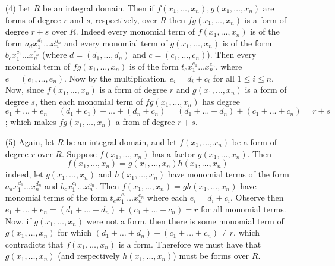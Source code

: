 \begin{example}
\begin{enumerate}
    \item[(4)] Let $R$ be an integral domain. Then if $f(x_1, \dots,
      x_n), g(x_1, \dots, x_n)$ are forms of degree $r$ and $s$,
      respectively, over $R$ then $fg(x_1, \dots, x_n)$ is a form of
      degree $r+s$ over $R$. Indeed every monomial term of $f(x_1,
      \dots, x_n)$ is of the form $a_dx_1^{d_1} \dots x_n^{d_n}$ and
      every monomial term of $g(x_1, \dots, x_n)$ is of the form
      $b_cx_1^{c_1} \dots x_n^{c_n}$ (where $d=(d_1, \dots, d_n)$ and
      $c=(c_1, \dots, c_n)$). Then every monomial term of $fg(x_1,
      \dots, x_n)$ is of the form $t_ex_1^{e_1} \dots x_n^{e_n}$,
      where $e=(e_1, \dots, e_n)$. Now by the multiplication,
      $e_i=d_i+c_i$ for all $1 \leq i \leq n$. Now, since $f(x_1,
      \dots, x_n)$ is a form of degree $r$ and  $g(x_1, \dots, x_n)$
      is a form of degree $s$, then each monomial term of $fg(x_1,
      \dots, x_n)$ has degree $e_1+\dots+e_n=(d_1+c_1)+\dots+(d_n+c_n)=
      (d_1+\dots+d_n)+(c_1+\dots+c_n)=r+s$; which makes $fg(x_1,
      \dots, x_n)$ a from of degree $r+s$.

    \item[(5)] Again, let $R$ be an integral domain, and let $f(x_1,
      \dots, x_n)$ be a form of degree $r$ over $R$. Suppose $f(x_1,
      \dots, x_n)$ has a factor $g(x_1, \dots, x_n)$. Then
      \begin{equation*}
        f(x_1, \dots, x_n)=g(x_1, \dots, x_n)h(x_1, \dots, x_n)
      \end{equation*}
      indeed, let $g(x_1, \dots, x_n)$ and $h(x_1, \dots, x_n)$ have
      monomial terms of the form $a_dx_1^{d_1} \dots x_n^{d_n}$ and
      $b_cx_1^{c_1} \dots x_n^{c_n}$. Then $f(x_1, \dots, x_n)=
      gh(x_1, \dots, x_n)$ have monomial terms of the form $t_ex_1^{e_1} \dots x_n^{e_n}$ where
      each $e_i=d_i+c_i$. Observe then $e_1+\dots+e_n=
      (d_1+\dots+d_n)+(c_1+\dots+c_n)=r$ for all monomial terms. Now,
      if $g(x_1, \dots, x_n)$ were not a form, then there is some
      monomial term of $g(x_1, \dots, x_n)$ for which
      $(d_1+\dots+d_n)+(c_1+\dots+c_n) \neq r$, which contradicts that
      $f(x_1, \dots, x_n)$ is a form. Therefore we must have that
      $g(x_1, \dots, x_n)$ (and respectively $h(x_1, \dots, x_n)$)
      must be forms over $R$.
  \end{enumerate}
\end{example}

